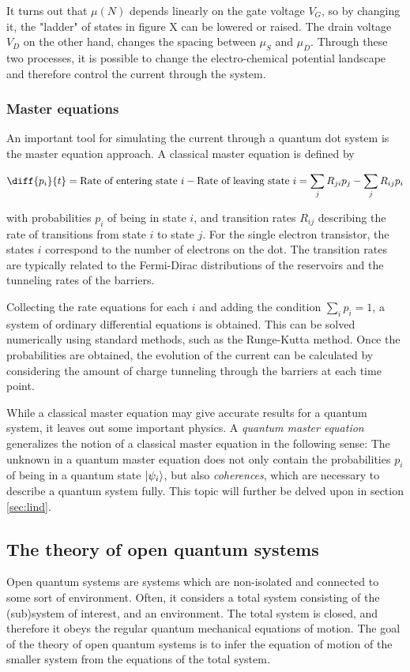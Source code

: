 \documentclass[../main.tex]{subfiles}
\begin{document}
It turns out that $\mu(N)$ depends linearly on the gate voltage $V_G$, so by changing it, the "ladder" of states in figure X can be lowered or raised. The drain voltage $V_D$ on the other hand, changes the spacing between $\mu_S$ and $\mu_D$. Through these two processes, it is possible to change the electro-chemical potential landscape and therefore control the current through the system. 

\subsubsection{Master equations}
An important tool for simulating the current through a quantum dot system is the master equation approach. A classical master equation is defined by

\begin{equation}\label{master}
    \diff{p_i}{t} = \text{Rate of entering state } i - \text{Rate of leaving state } i = \sum_j R_{ji}p_j  - \sum_j R_{ij}p_i
\end{equation}

with probabilities $p_i$ of being in state $i$, and transition rates $R_{ij}$ describing the rate of transitions from state $i$ to state $j$. For the single electron transistor, the states $i$ correspond to the number of electrons on the dot. The transition rates are typically related to the Fermi-Dirac distributions of the reservoirs and the tunneling rates of the barriers.

Collecting the rate equations for each $i$ and adding the condition $\sum_i p_i = 1$, a system of ordinary differential equations is obtained. This can be solved numerically using standard methods, such as the Runge-Kutta method. Once the probabilities are obtained, the evolution of the current can be calculated by considering the amount of charge tunneling through the barriers at each time point.

While a classical master equation may give accurate results for a quantum system, it leaves out some important physics. A \textit{quantum master equation} generalizes the notion of a classical master equation in the following sense: The unknown in a quantum master equation does not only contain the probabilities $p_i$ of being in a quantum state $\ket{\psi_i}$, but also \textit{coherences}, which are necessary to describe a quantum system fully. This topic will further be delved upon in section \ref{sec:lind}.
\subsection{The theory of open quantum systems}
Open quantum systems are systems which are non-isolated and connected to some sort of environment. Often, it considers a total system consisting of the (sub)system of interest, and an environment. The total system is closed, and therefore it obeys the regular quantum mechanical equations of motion. The goal of the theory of open quantum systems is to infer the equation of motion of the smaller system from the equations of the total system. 
\end{document}

